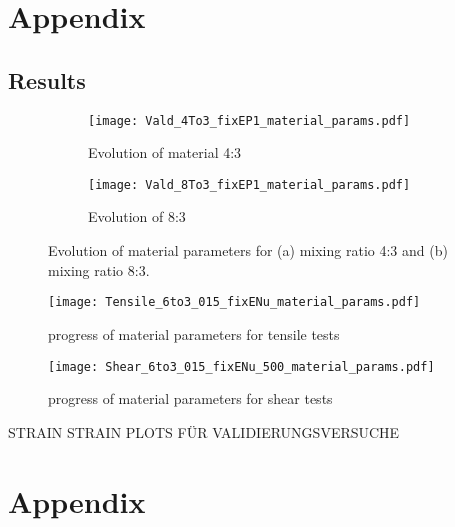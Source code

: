 \begin{appendices}
    \chapter{Appendix}
    \section{Results}


    \begin{figure}[H]
    \centering
    \begin{subfigure}[t]{1.0\textwidth}
        \centering
        \texttt{[image: Vald\_4To3\_fixEP1\_material\_params.pdf]}
        \caption{Evolution of material 4:3}
        \label{fig:material_params_4to3}
    \end{subfigure}
    \begin{subfigure}[t]{1.0\textwidth}
        \centering
        \texttt{[image: Vald\_8To3\_fixEP1\_material\_params.pdf]}
        \caption{Evolution of 8:3}
        \label{fig:material_params_8to3}
    \end{subfigure}
    \caption{Evolution of material parameters for (a) mixing ratio 4:3 and (b) mixing ratio 8:3.}
    \label{fig:validation_material_params}
    \end{figure}

    \begin{figure}[H]
    \centering
    \texttt{[image: Tensile\_6to3\_015\_fixENu\_material\_params.pdf]}
    \caption{progress of material parameters for tensile tests}
    \label{fig:tensileMatParams}
    \end{figure}

    \begin{figure}[H]
    \centering
    \texttt{[image: Shear\_6to3\_015\_fixENu\_500\_material\_params.pdf]}
    \caption{progress of material parameters for shear tests}
    \label{fig:shearMatParams}
    \end{figure}


    STRAIN STRAIN PLOTS FÜR VALIDIERUNGSVERSUCHE
    \chapter{Appendix}
\end{appendices}
